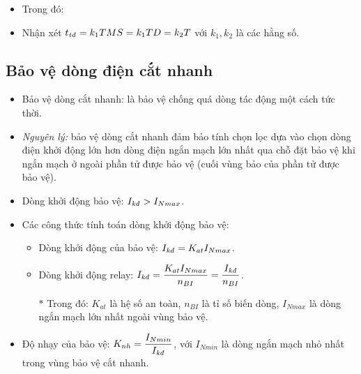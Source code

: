 \documentclass[12pt,a4paper]{article}
\begin{document}
\begin{itemize}
\begin{itemize}
\begin{list}{+}{}
\begin{itemize}
								\item Trong đó: 

								\item Nhận xét $t_{\text{\textit{tđ}}} = k_1 TMS = k_1 TD = k_2 T$ với $k_1, k_2$ là các hằng số.
							\end{itemize}
					\end{list}
			\end{itemize}
	\end{itemize}

\subsection{Bảo vệ dòng điện cắt nhanh}
	\begin{itemize}
		\item Bảo vệ dòng cắt nhanh: là bảo vệ chống quá dòng tác động một cách tức thời.
		
		\item \emph{Nguyên lý:} bảo vệ dòng cắt nhanh đảm bảo tính chọn lọc dựa vào chọn dòng điện khởi động lớn hơn dòng điện ngắn mạch lớn nhất qua chỗ đặt bảo vệ khi ngắn mạch ở ngoài phần tử được bảo vệ (cuối vùng bảo của phần tử được bảo vệ).
		
		\item Dòng khởi động bảo vệ: $I_{\text{\textit{kđ}}} > I_{Nmax}$.
		
		\item Các công thức tính toán dòng khởi động bảo vệ:
			\begin{itemize}
				\item Dòng khởi động của bảo vệ: $I_{\text{\textit{kđ}}} = K_{at}I_{Nmax}$.
				
				\item Dòng khởi động relay: $I_{\text{\textit{kđ}}} = \dfrac{K_{at}I_{Nmax}}{n_{BI}} = \dfrac{I_{\text{\textit{kđ}}}}{n_{BI}}$.
				
				\item[$\ast$] Trong đó: $K_{at}$ là hệ số an toàn, $n_{BI}$ là tỉ số biến dòng, $I_{Nmax}$ là dòng ngắn mạch lớn nhất ngoài vùng bảo vệ.	
			\end{itemize}

		\item Độ nhạy của bảo vệ: $K_{nh} = \dfrac{I_{Nmin}}{I_{\text{\textit{kđ}}}}$, với $I_{Nmin}$ là dòng ngắn mạch nhỏ nhất trong vùng bảo vệ cắt nhanh.		
	\end{itemize}
	
\end{document}

